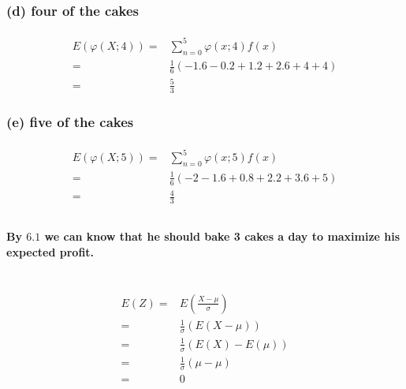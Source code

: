 \documentclass{article}
\begin{document}
            \subsubsection*{   (d) four of the cakes}
            \paragraph{
                \begin{equation*}
                    \begin{split}
                        E(\varphi(X;4))=&\sum _{n=0} ^5 \varphi(x;4)f(x)\\
                                    =&\frac{1}{6}(-1.6-0.2+1.2+2.6+4+4)\\
                                    =&\frac{5}{3}
                    \end{split}
                \end{equation*}
            }
            \subsubsection*{    (e) five of the cakes}
            \paragraph{
                \begin{equation*}
                    \begin{split}
                        E(\varphi(X;5))=&\sum _{n=0} ^5 \varphi(x;5)f(x)\\
                                    =&\frac{1}{6}(-2-1.6+0.8+2.2+3.6+5)\\
                                    =&\frac{4}{3}
                    \end{split}
                \end{equation*}
            }
        \subsection{}
            \paragraph{
                By $6.1$ we can know that he should bake 3 cakes a day to maximize his expected profit.
            }
    
    \section{}
            \begin{equation*}
                \begin{split}
                    E(Z)=&E(\frac{X-\mu}{\sigma})\\
                        =&\frac{1}{\sigma}(E(X-\mu))\\
                        =&\frac{1}{\sigma}(E(X)-E(\mu))\\
                        =&\frac{1}{\sigma}(\mu-\mu)\\
                        =&0
                \end{split}
            \end{equation*}
\end{document}
